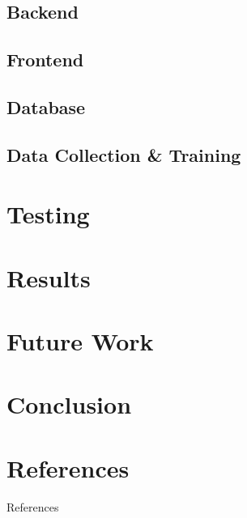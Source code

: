 \documentclass{article}
\begin{document}
\begin{multicols}{2}
    \subsection{Backend}
    \lipsum[19-21]
    \subsection{Frontend}
    \lipsum[39-41]
    \subsection{Database}
    \lipsum[41-43]
    \subsection{Data Collection \& Training}
    \lipsum[21-23]

    \section{Testing}
    \lipsum[23-27]

    \section{Results}
    \lipsum[43-45]

    \section{Future Work}
    \lipsum[35-39]

    \section{Conclusion}
    \lipsum[27-31]

    \pagebreak

    
  \end{multicols}
  
  \section*{References}
  References
\end{document}
